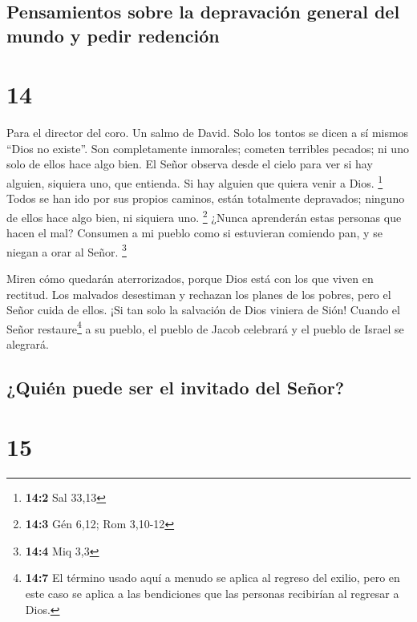 \hypertarget{pensamientos-sobre-la-depravaciuxf3n-general-del-mundo-y-pedir-redenciuxf3n}{%
\subsection{Pensamientos sobre la depravación general del mundo y pedir
redención}\label{pensamientos-sobre-la-depravaciuxf3n-general-del-mundo-y-pedir-redenciuxf3n}}

\hypertarget{section-13}{%
\section{14}\label{section-13}}

Para el director del coro. Un salmo de David.  Solo los
tontos se dicen a sí mismos ``Dios no existe''. Son completamente
inmorales; cometen terribles pecados; ni uno solo de ellos hace algo
bien.  El Señor observa desde el cielo para ver si hay
alguien, siquiera uno, que entienda. Si hay alguien que quiera venir a
Dios. \footnote{\textbf{14:2} Sal 33,13}  Todos se han ido
por sus propios caminos, están totalmente depravados; ninguno de ellos
hace algo bien, ni siquiera uno. \footnote{\textbf{14:3} Gén 6,12; Rom
  3,10-12}  ¿Nunca aprenderán estas personas que hacen el
mal? Consumen a mi pueblo como si estuvieran comiendo pan, y se niegan a
orar al Señor. \footnote{\textbf{14:4} Miq 3,3}

 Miren cómo quedarán aterrorizados, porque Dios está con
los que viven en rectitud.  Los malvados desestiman y
rechazan los planes de los pobres, pero el Señor cuida de ellos.
 ¡Si tan solo la salvación de Dios viniera de Sión! Cuando
el Señor restaure\footnote{\textbf{14:7} El término usado aquí a menudo
  se aplica al regreso del exilio, pero en este caso se aplica a las
  bendiciones que las personas recibirían al regresar a Dios.} a su
pueblo, el pueblo de Jacob celebrará y el pueblo de Israel se alegrará.

\hypertarget{quiuxe9n-puede-ser-el-invitado-del-seuxf1or}{%
\subsection{¿Quién puede ser el invitado del
Señor?}\label{quiuxe9n-puede-ser-el-invitado-del-seuxf1or}}

\hypertarget{section-14}{%
\section{15}\label{section-14}}

